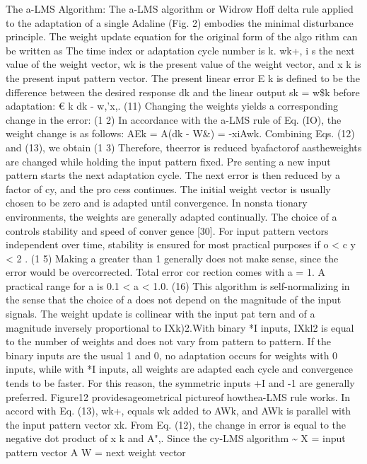 \documentclass[11pt,a4paper,twocolumn]{article}
\begin{document}
The a-LMS Algorithm: The a-LMS algorithm or Widrow
Hoff delta rule applied to the adaptation of a single Adaline 
(Fig. 2) embodies the minimal disturbance principle. The 
weight update equation for the original form of the algo
rithm can be written as 
The time index or adaptation cycle number is k. wk+, i s  the 
next value of the weight vector, wk is the present value of 
the weight vector, and x k  is the present input pattern vector. 
The present linear error E k  is defined to be the difference 
between the desired response dk and the linear output sk 
= w\$k before adaptation: 
€ k  
dk - w,'x,. 
(11) 
Changing the weights yields a corresponding change in the 
error: 
(1 2) 
In accordance with the a-LMS rule of Eq. (IO), the weight 
change is as follows: 
AEk = A(dk - W\&) 
= -xiAwk. 
Combining Eqs. (12) and (13), we obtain 
(1 3) 
Therefore, theerror is reduced byafactorof aastheweights 
are changed while holding the input pattern fixed. Pre
senting a new input pattern starts the next adaptation cycle. 
The next error is then reduced by a factor of cy, and the pro
cess continues. The initial weight vector is usually chosen 
to be zero and is adapted until convergence. In nonsta
tionary environments, the weights are generally adapted 
continually. 
The choice of a controls stability and speed of conver
gence [30]. For input pattern vectors independent over time, 
stability is ensured for most practical purposes if 
o < c y < 2 .  
(1 5) 
Making a greater than 1 generally does not make sense, 
since the error would be overcorrected. Total error cor
rection comes with a = 1. A practical range for a is 
0.1 < a < 1.0. 
(16) 
This algorithm is self-normalizing in the sense that the 
choice of a does not depend on the magnitude of the input 
signals. The weight update is collinear with the input pat
tern and of a magnitude inversely proportional to IXk)2.With 
binary *I inputs, IXkl2 is equal to the number of weights 
and does not vary from pattern to pattern. If the binary 
inputs are the usual 1 and 0, no adaptation occurs for 
weights with 0 inputs, while with *I 
inputs, all weights are 
adapted each cycle and convergence tends to be faster. For 
this reason, the symmetric inputs +I 
and -1 are generally 
preferred. 
Figure12 providesageometrical pictureof howthea-LMS 
rule works. In accord with Eq. (13), wk+, equals wk added 
to AWk, and AWk is parallel with the input pattern vector 
xk. From Eq. (12), the change in error is equal to the negative 
dot product of x k  and A",. 
Since the cy-LMS algorithm 
\~{} 
X = input pattern vector 
A 
W 
= next weight vector 
\end{document}

